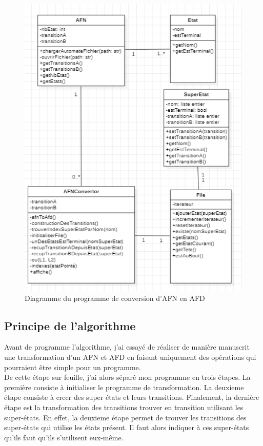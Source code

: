 \documentclass[a4paper]{article}
\begin{document}
\begin{figure}[!h]
	\centering
	\includegraphics[scale=0.8]{src/diagramme_afnToAfd.PNG}
	\caption{Diagramme du programme de conversion d'AFN en AFD}
\end{figure}

\newpage
\subsection{Principe de l'algorithme}

Avant de programme l'algorithme, j'ai essayé de réaliser de manière manuscrit une transformation
d'un AFN et AFD en faisant uniquement des opérations qui pourraient être simple pour un programme.\\

De cette étape sur feuille, j'ai alors séparé mon programme en trois étapes. La première consiste
à initialiser le programme de transformation. La deuxieme étape consiste à creer des super états et
leurs transitions. Finalement, la dernière étape est la transformation des transitions trouver en 
transition utilisant les super-états. En effet, la deuxieme étape permet de trouver les transitions
des super-états qui utilise les états présent. Il faut alors indiquer à ces super-états qu'ils
faut qu'ils s'utilisent eux-même.\\
\end{document}
